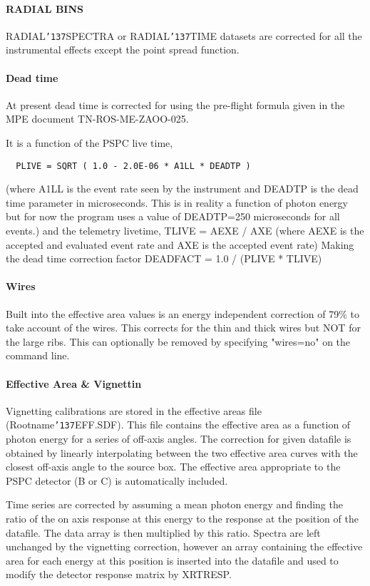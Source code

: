 \documentclass{book}
\renewcommand{\_}{{\tt\char'137}}     %
\begin{document}
\paragraph{RADIAL BINS}
RADIAL\_SPECTRA or RADIAL\_TIME datasets are corrected for all the
instrumental effects except the point spread function.
 
\paragraph{Dead time}
At present dead time is corrected for using the pre-flight formula
given in the MPE document TN-ROS-ME-ZAOO-025.
 
It is a function of the PSPC live time,
 
\begin{verbatim}
  PLIVE = SQRT ( 1.0 - 2.0E-06 * A1LL * DEADTP )
\end{verbatim}
(where A1LL is the event rate seen by the instrument and DEADTP is
the dead time parameter in microseconds. This is in reality a
function of photon energy but for now the program uses a value of
DEADTP=250 microseconds for all events.)
and the telemetry livetime,
TLIVE = AEXE / AXE
(where AEXE is the accepted and evaluated event rate and AXE is the
accepted event rate)
Making the dead time correction factor
DEADFACT = 1.0 / (PLIVE * TLIVE)
\paragraph{Wires}
Built into the effective area values is an energy independent correction
of 79\% to take account of the wires. This corrects for the thin and thick
wires but NOT for the large ribs. This can optionally be removed by
specifying "wires=no" on the command line.
 
\paragraph{Effective Area \& Vignettin}
Vignetting calibrations are stored in the effective areas file
(Rootname\_EFF.SDF). This file contains the effective area as a
function of photon energy for a series of off-axis angles. The
correction for given datafile is obtained by linearly interpolating
between the two effective area curves with the closest off-axis angle
to the source box. The effective area appropriate to the PSPC detector
(B or C) is automatically included.
 
Time series are corrected by assuming a mean photon energy and finding
the ratio of the on axis response at this energy to the response at the
position of the datafile. The data array is then multiplied by this
ratio. Spectra are left unchanged by the vignetting correction, however
an array containing the effective area for each energy at this position
is inserted into the datafile and used to modify the detector response
matrix by XRTRESP.
 
\end{document}
